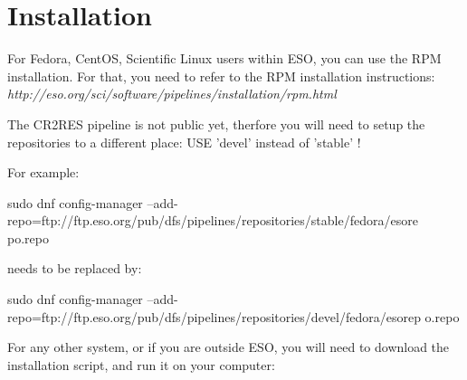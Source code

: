 \section{Installation}
\label{sec:installation}



\label{sec:install-howto}

For Fedora, CentOS, Scientific Linux users within ESO, you can use the RPM
installation.
For that, you need to refer to the RPM installation instructions:
{\it http://eso.org/sci/software/pipelines/installation/rpm.html}

The CR2RES pipeline is not public yet, therfore you will need to setup the
repositories to a different place:
USE 'devel' instead of 'stable' !

For example:

sudo dnf config-manager
--add-repo=ftp://ftp.eso.org/pub/dfs/pipelines/repositories/stable/fedora/esore
po.repo

needs to be replaced by:

sudo dnf config-manager
--add-repo=ftp://ftp.eso.org/pub/dfs/pipelines/repositories/devel/fedora/esorep
o.repo

For any other system, or if you are outside ESO, you will need to download the
installation script, and run it on your computer:

